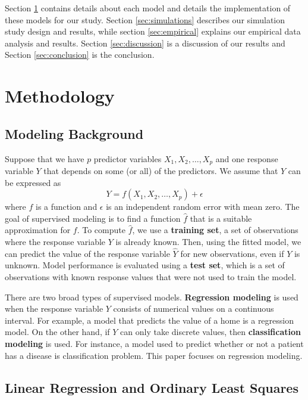 \documentclass{article}
\begin{document}
Section \ref{sec:methodology} contains details about each model and details the implementation of these models for our study. Section \ref{sec:simulations} describes our simulation study design and results, while section \ref{sec:empirical} explains our empirical data analysis and results. Section \ref{sec:discussion} is a discussion of our results and Section \ref{sec:conclusion} is the conclusion.

\newpage
\section{Methodology}\label{sec:methodology}
\subsection{Modeling Background}

Suppose that we have $p$ predictor variables $X_1, X_2, \dotsc, X_p$ and one response variable $Y$ that depends on some (or all) of the predictors. We assume that $Y$ can be expressed as
\begin{equation}\label{eqn:relationship}
	Y = f(X_1, X_2, \dotsc, X_p) + \epsilon
\end{equation}
where $f$ is a function and $\epsilon$ is an independent random error with mean zero. The goal of supervised modeling is to find a function $\hat{f}$ that is a suitable approximation for $f$. To compute $\hat{f}$, we use a \textbf{training set}, a set of observations where the response variable $Y$ is already known. Then, using the fitted model, we can predict the value of the response variable $\hat{Y}$ for new observations, even if $Y$ is unknown. Model performance is evaluated using a \textbf{test set}, which is a set of observations with known response values that were not used to train the model.

There are two broad types of supervised models. \textbf{Regression modeling} is used when the response variable $Y$ consists of numerical values on a continuous interval. For example, a model that predicts the value of a home is a regression model. On the other hand, if $Y$ can only take discrete values, then \textbf{classification modeling} is used. For instance, a model used to predict whether or not a patient has a disease is classification problem. This paper focuses on regression modeling.

\subsection{Linear Regression and Ordinary Least Squares}
\end{document}
